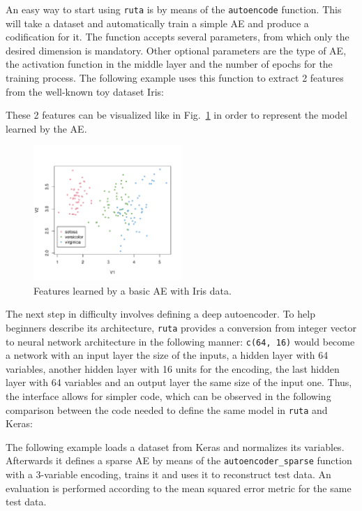 \documentclass[
	fontsize=11pt, %
	twoside=false, %
	open=any, %
	secnumdepth=1, %
]{kaobook}
\newcommand{\revised}[1]{#1}
\begin{document}
An easy way to start using \texttt{ruta} is by means of the \texttt{autoencode} function. This will take a dataset and  automatically train a simple AE and produce a codification for it. The function accepts several parameters, from which only the desired dimension is mandatory. Other optional parameters are the type of AE, the activation function in the middle layer and the number of epochs for the training process. The following example uses this function to extract 2 features from the well-known toy dataset Iris:



These 2 features can be visualized like in Fig.~\ref{fig.iris} in order to represent the model learned by the AE.

\begin{figure}[ht]
  \centering
  \includegraphics[width=0.5\textwidth]{iris.pdf}
  \caption{Features learned by a basic AE with Iris data.}
  \label{fig.iris}
\end{figure}

\revised{The next step in difficulty involves defining a deep autoencoder. To help beginners describe its architecture, \texttt{ruta} provides a conversion from integer vector to neural network architecture in the following manner: \texttt{c(64, 16)} would become a network with an input layer the size of the inputs, a hidden layer with 64 variables, another hidden layer with 16 units for the encoding, the last hidden layer with 64 variables and an output layer the same size of the input one. Thus, the interface allows for simpler code, which can be observed in the following comparison between the code needed to define the same model in \texttt{ruta} and Keras:
}



The following example loads a dataset from Keras and normalizes its variables. Afterwards it defines a sparse AE by means of the \texttt{autoencoder\_sparse} function with a 3-variable encoding, trains it and uses it to reconstruct test data. An evaluation is performed according to the mean squared error metric for the same test data.
\end{document}
